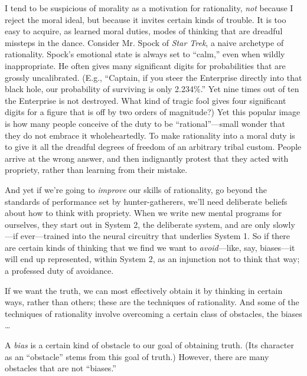 {
 I tend to be suspicious of morality as a motivation for
rationality, \textit{not} because I reject the moral ideal, but because
it invites certain kinds of trouble. It is too easy to acquire, as
learned moral duties, modes of thinking that are dreadful missteps in
the dance. Consider Mr. Spock of \textit{Star Trek}, a naive archetype
of rationality. Spock's emotional state is always set
to ``calm,'' even when wildly
inappropriate. He often gives many significant digits for probabilities
that are grossly uncalibrated. (E.g., ``Captain, if
you steer the Enterprise directly into that black hole, our probability
of surviving is only 2.234\%.'' Yet nine times out of
ten the Enterprise is not destroyed. What kind of tragic fool gives
four significant digits for a figure that is off by two orders of
magnitude?) Yet this popular image is how many people conceive of the
duty to be ``rational''---small
wonder that they do not embrace it wholeheartedly. To make rationality
into a moral duty is to give it all the dreadful degrees of freedom of
an arbitrary tribal custom. People arrive at the wrong answer, and then
indignantly protest that they acted with propriety, rather than
learning from their mistake.}

{
 And yet if we're going to \textit{improve} our
skills of rationality, go beyond the standards of performance set by
hunter-gatherers, we'll need deliberate beliefs about
how to think with propriety. When we write new mental programs for
ourselves, they start out in System 2, the deliberate system, and are
only slowly---if ever---trained into the neural circuitry that
underlies System 1. So if there are certain kinds of thinking that we
find we want to \textit{avoid}{}---like, say, biases---it will end up
represented, within System 2, as an injunction not to think that way; a
professed duty of avoidance.}

{
 If we want the truth, we can most effectively obtain it by
thinking in certain ways, rather than others; these are the techniques
of rationality. And some of the techniques of rationality involve
overcoming a certain class of obstacles, the biases \ldots}

\myendsectiontext


{
 A \textit{bias} is a certain kind of obstacle to our goal of
obtaining truth. (Its character as an
``obstacle'' stems from this goal of
truth.) However, there are many obstacles that are not
``biases.'' }

